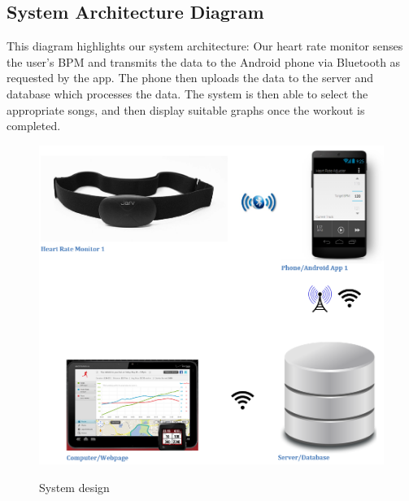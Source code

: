 \documentclass[letterpaper,english, 12pt]{scrreprt}
\begin{document}
\subsection{System Architecture Diagram}
This diagram highlights our system architecture: Our heart rate monitor senses the
user's BPM and transmits the data to the Android phone via Bluetooth as requested
by the app. The phone then uploads the data to the server and database
which processes the data. The system is then able to select the appropriate
songs, and then display suitable graphs once the workout is completed.\\

\begin{center}
	\begin{figure}[H]
		\includegraphics{img/system_architecture.png}\\
		\caption{System design}
	\end{figure}
\end{center}
\end{document}
